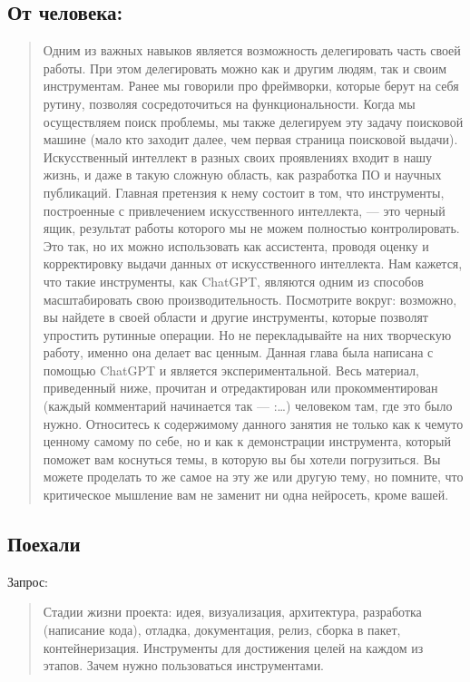 \documentclass[letterpaper,10pt,russian]{sphinxmanual}
\begin{document}
\subsection{От человека:}
\label{\detokenize{educational_materials/stages/content:id2}}\begin{quote}

\sphinxAtStartPar
Одним из важных навыков является возможность делегировать часть своей работы. При этом делегировать можно как и другим людям, так и своим инструментам. Ранее мы говорили про фреймворки, которые берут на себя рутину, позволяя сосредоточиться на функциональности. Когда мы осуществляем поиск проблемы, мы также делегируем эту задачу поисковой машине (мало кто заходит далее, чем первая страница поисковой выдачи). Искусственный интеллект в разных своих проявлениях входит в нашу жизнь, и даже в такую сложную область, как разработка ПО и  научных публикаций. Главная претензия к нему состоит в том, что инструменты, построенные с привлечением искусственного интеллекта, — это черный ящик, результат работы которого мы не можем полностью контролировать. Это так, но их можно использовать как ассистента, проводя оценку и корректировку выдачи данных от искусственного интеллекта. Нам кажется, что такие инструменты, как ChatGPT, являются одним из способов масштабировать свою производительность. Посмотрите вокруг: возможно, вы найдете в своей области и другие инструменты, которые позволят упростить рутинные операции. Но не перекладывайте на них творческую работу, именно она делает вас ценным. Данная глава была написана с помощью ChatGPT и является экспериментальной. Весь материал, приведенный ниже, прочитан и отредактирован или прокомментирован (каждый комментарий начинается так — :…) человеком там, где это было нужно. Относитесь к содержимому данного занятия не только как к чему\sphinxhyphen{}то ценному самому по себе, но и как к демонстрации инструмента, который поможет вам коснуться темы, в которую вы бы хотели погрузиться. Вы можете проделать то же самое на эту же или другую тему, но помните, что критическое мышление вам не заменит ни одна нейросеть, кроме вашей.
\end{quote}


\subsection{Поехали}
\label{\detokenize{educational_materials/stages/content:id3}}
\sphinxAtStartPar
Запрос:
\begin{quote}

\sphinxAtStartPar
Стадии жизни проекта: идея, визуализация, архитектура, разработка (написание кода), отладка, документация, релиз, сборка в пакет, контейнеризация. Инструменты для достижения целей на каждом из этапов. Зачем нужно пользоваться инструментами.
\end{quote}
\end{document}
